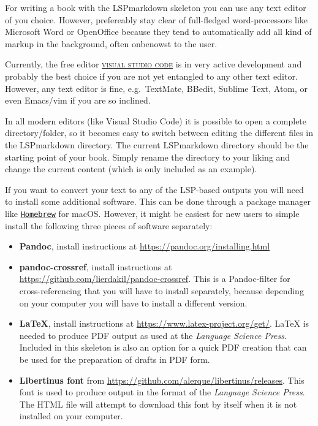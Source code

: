 For\paragraphnumber{[1.8]} writing a book with the LSPmarkdown skeleton
you can use any text editor of you choice. However, prefereably stay
clear of full-fledged word-processors like Microsoft Word or OpenOffice
because they tend to automatically add all kind of markup in the
background, often onbenowst to the user.

Currently,\paragraphnumber{[1.9]} the free editor
\href{https://code.visualstudio.com}{\textsc{visual studio code}} is in
very active development and probably the best choice if you are not yet
entangled to any other text editor. However, any text editor is fine,
e.g.~TextMate, BBedit, Sublime Text, Atom, or even Emacs/vim if you are
so inclined.

In\paragraphnumber{[1.10]} all modern editors (like Visual Studio Code)
it is possible to open a complete directory/folder, so it becomes easy
to switch between editing the different files in the LSPmarkdown
directory. The current LSPmarkdown directory should be the starting
point of your book. Simply rename the directory to your liking and
change the current content (which is only included as an example).

If\paragraphnumber{[1.11]} you want to convert your text to any of the
LSP-based outputs you will need to install some additional software.
This can be done through a package manager like
\href{https://brew.sh}{\texttt{Homebrew}} for macOS. However, it might
be easiest for new users to simple install the following three pieces of
software separately:

\begin{itemize}
\tightlist
\item
  \textbf{Pandoc}, install instructions at
  \url{https://pandoc.org/installing.html}
\item
  \textbf{pandoc-crossref}, install instructions at
  \url{https://github.com/lierdakil/pandoc-crossref}. This is a
  Pandoc-filter for cross-referencing that you will have to install
  separately, because depending on your computer you will have to
  install a different version.
\item
  \textbf{LaTeX}, install instructions at
  \url{https://www.latex-project.org/get/}. LaTeX is needed to produce
  PDF output as used at the \emph{Language Science Press}. Included in
  this skeleton is also an option for a quick PDF creation that can be
  used for the preparation of drafts in PDF form.
\item
  \textbf{Libertinus font} from
  \url{https://github.com/alerque/libertinus/releases}. This font is
  used to produce output in the format of the \emph{Language Science
  Press}. The HTML file will attempt to download this font by itself
  when it is not installed on your computer.
\end{itemize}

